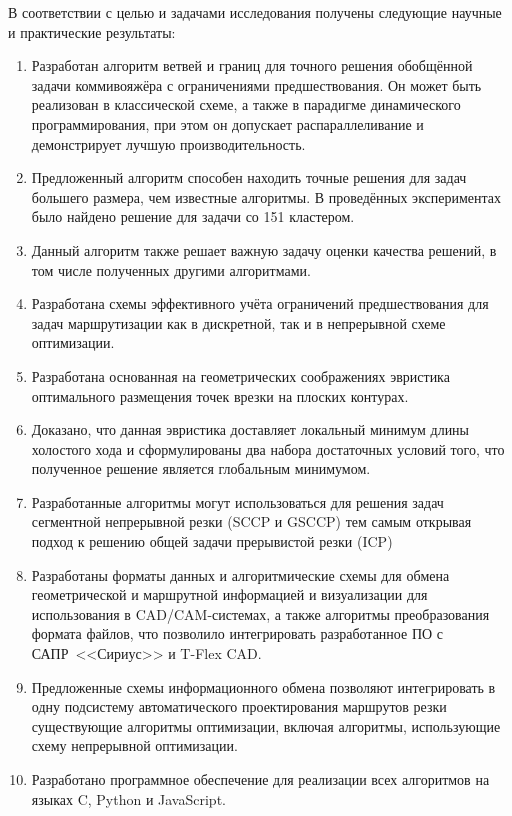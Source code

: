 В соответствии с целью и задачами исследования получены следующие
научные и практические результаты:

\begin{enumerate}
  \item
  Разработан алгоритм ветвей и границ для точного решения
  обобщённой задачи коммивояжёра с ограничениями предшествования.
  Он может быть реализован в классической схеме,
  а также в парадигме динамического программирования,
  при этом он допускает
  распараллеливание и демонстрирует лучшую производительность.
  \item
  Предложенный алгоритм способен находить точные решения для задач большего размера,
  чем известные алгоритмы.
  В проведённых экспериментах было найдено решение для
  задачи со 151 кластером.
  \item
  Данный алгоритм также решает важную задачу оценки качества решений,
  в том числе
  полученных другими алгоритмами.
  \item
  Разработана схемы эффективного учёта ограничений предшествования
  для задач маршрутизации как в дискретной,
  так и в непрерывной схеме оптимизации.
  \item
  Разработана основанная на геометрических соображениях эвристика
  оптимального размещения точек врезки на плоских контурах.
  \item
  Доказано, что данная эвристика доставляет локальный минимум длины холостого хода
  и сформулированы два набора достаточных условий того,
  что полученное решение является глобальным минимумом.
  \item
  Разработанные алгоритмы могут использоваться для
  решения задач сегментной непрерывной резки (SCCP и GSCCP)
  тем самым открывая подход к решению общей задачи прерывистой резки
  (ICP)
  \item
  Разработаны форматы данных
  и алгоритмические схемы
  для обмена геометрической и маршрутной
  информацией и визуализации для использования в CAD/CAM-системах,
  а также алгоритмы преобразования формата файлов,
  что позволило интегрировать разработанное ПО
  с САПР~<<Сириус>>
  и T-Flex CAD.
  \item
  Предложенные схемы информационного обмена
  позволяют интегрировать в одну подсистему
  автоматического проектирования маршрутов резки
  существующие алгоритмы оптимизации,
  включая алгоритмы,
  использующие схему непрерывной оптимизации.
  \item
  Разработано программное обеспечение для реализации всех алгоритмов
  на языках C, Python и JavaScript.
\end{enumerate}

